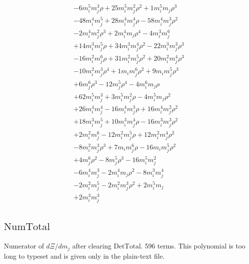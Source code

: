 {\begin{align*}
&-6m_i^{5}m_j^{3}\rho+25m_i^{5}m_j^{2}\rho^{2}+1m_i^{5}m_j\rho^{3}\\
&-48m_i^{4}m_j^{5}+28m_i^{4}m_j^{4}\rho-58m_i^{4}m_j^{3}\rho^{2}\\
&-2m_i^{4}m_j^{2}\rho^{3}+2m_i^{4}m_j\rho^{4}-4m_i^{3}m_j^{6}\\
&+14m_i^{3}m_j^{5}\rho+34m_i^{3}m_j^{4}\rho^{2}-22m_i^{3}m_j^{3}\rho^{3}\\
&-16m_i^{2}m_j^{6}\rho+31m_i^{2}m_j^{5}\rho^{2}+20m_i^{2}m_j^{4}\rho^{3}\\
&-10m_i^{2}m_j^{3}\rho^{4}+1m_im_j^{6}\rho^{2}+9m_im_j^{5}\rho^{3}\\
&+6m_j^{6}\rho^{3}-12m_j^{5}\rho^{4}-4m_i^{6}m_j\rho\\
&+62m_i^{5}m_j^{3}+3m_i^{5}m_j^{2}\rho-4m_i^{5}m_j\rho^{2}\\
&+26m_i^{4}m_j^{4}-16m_i^{4}m_j^{3}\rho+16m_i^{4}m_j^{2}\rho^{2}\\
&+18m_i^{3}m_j^{5}+10m_i^{3}m_j^{4}\rho-16m_i^{3}m_j^{3}\rho^{2}\\
&+2m_i^{2}m_j^{6}-12m_i^{2}m_j^{5}\rho+12m_i^{2}m_j^{4}\rho^{2}\\
&-8m_i^{2}m_j^{3}\rho^{3}+7m_im_j^{6}\rho-16m_im_j^{5}\rho^{2}\\
&+4m_j^{6}\rho^{2}-8m_j^{5}\rho^{3}-16m_i^{5}m_j^{2}\\
&-6m_i^{4}m_j^{3}-2m_i^{4}m_j\rho^{2}-8m_i^{3}m_j^{4}\\
&-2m_i^{2}m_j^{5}-2m_i^{2}m_j^{3}\rho^{2}+2m_i^{5}m_j\\
&+2m_i^{3}m_j^{3}
\end{align*}
}

\subsection*{$\mathrm{NumTotal}$}
Numerator of $d\Xi/dm_j$ after clearing $\mathrm{DetTotal}$. 596 terms.
This polynomial is too long to typeset and is given only in the plain-text file.

